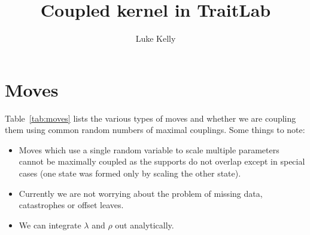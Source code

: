 \documentclass[11pt,a4paper]{article}
\title{\vspace{-2.5cm} Coupled kernel in TraitLab}
\author{Luke Kelly}
\begin{document}
\maketitle
\tableofcontents

\section{Moves}

Table~\ref{tab:moves} lists the various types of moves and whether we are coupling them using common random numbers of maximal couplings. Some things to note:
\begin{itemize}
    \item Moves which use a single random variable to scale multiple parameters cannot be maximally coupled as the supports do not overlap except in special cases (one state was formed only by scaling the other state).
    \item Currently we are not worrying about the problem of missing data, catastrophes or offset leaves.
    \item We can integrate $ \lambda $ and $ \rho $ out analytically.
\end{itemize}
\end{document}
